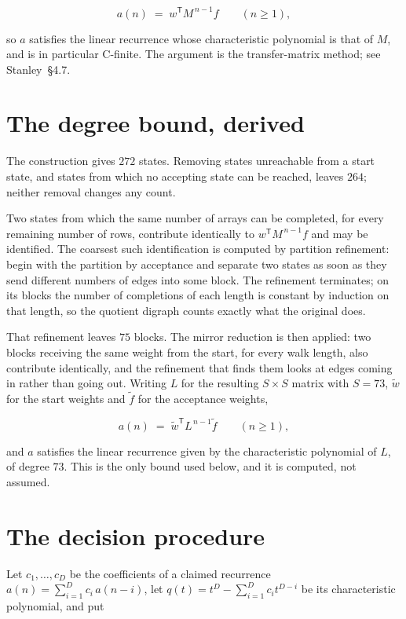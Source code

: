 \documentclass[11pt]{article}
\theoremstyle{definition}
\begin{document}
\[a(n) \;=\; w^{\mathsf T} M^{\,n-1} f \qquad (n \ge 1),\]

so $a$ satisfies the linear recurrence whose characteristic polynomial is that of $M$, and is in particular C-finite. The argument is the transfer-matrix method; see Stanley~\S4.7.

\section{The degree bound, derived}

The construction gives $272$ states. Removing states unreachable from a start state, and states from which no accepting state can be reached, leaves $264$; neither removal changes any count.

Two states from which the same number of arrays can be completed, for every remaining number of rows, contribute identically to $w^{\mathsf T}M^{\,n-1}f$ and may be identified. The coarsest such identification is computed by partition refinement: begin with the partition by acceptance and separate two states as soon as they send different numbers of edges into some block. The refinement terminates; on its blocks the number of completions of each length is constant by induction on that length, so the quotient digraph counts exactly what the original does.

That refinement leaves $75$ blocks. The mirror reduction is then applied: two blocks receiving the same weight from the start, for every walk length, also contribute identically, and the refinement that finds them looks at edges coming in rather than going out. Writing $L$ for the resulting $S \times S$ matrix with $S = 73$, $\tilde w$ for the start weights and $\tilde f$ for the acceptance weights,

\[a(n) \;=\; \tilde w^{\mathsf T} L^{\,n-1} \tilde f \qquad (n \ge 1),\]

and $a$ satisfies the linear recurrence given by the characteristic polynomial of $L$, of degree $73$. This is the only bound used below, and it is computed, not assumed.

\section{The decision procedure}

Let $c_1,\dots,c_D$ be the coefficients of a claimed recurrence $a(n) = \sum_{i=1}^{D} c_i\,a(n-i)$, let $q(t) = t^{D} - \sum_{i=1}^{D} c_i t^{D-i}$ be its characteristic polynomial, and put
\end{document}
